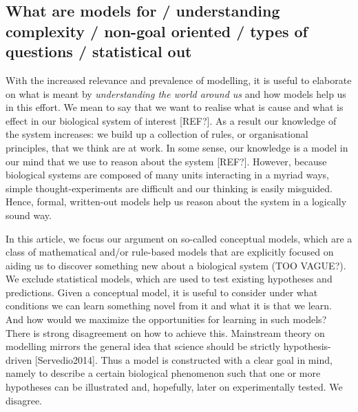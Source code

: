 \subsection{What are models for / understanding complexity / non-goal oriented / types of questions / statistical out}

With the increased relevance and prevalence of modelling, it is useful to elaborate on what is meant by \emph{understanding the world around us} and how models help us in this effort. We mean to say that we want to realise what is cause and what is effect in our biological system of interest [REF?]. As a result our knowledge of the system increases: we build up a collection of rules, or organisational principles, that we think are at work. In some sense, our knowledge is a model in our mind that we use to reason about the system [REF?]. However, because biological systems are composed of many units interacting in a myriad ways, simple thought-experiments are difficult and our thinking is easily misguided. Hence, formal, written-out models help us reason about the system in a logically sound way.

In this article, we focus our argument on so-called conceptual models, which are a class of mathematical and/or rule-based models that are explicitly focused on aiding us to discover something new about a biological system (TOO VAGUE?). We exclude statistical models, which are used to test existing hypotheses and predictions. Given a conceptual model, it is useful to consider under what conditions we can learn something novel from it and what it is that we learn. And how would we maximize the opportunities for learning in such models? There is strong disagreement on how to achieve this. Mainstream theory on modelling mirrors the general idea that science should be strictly hypothesis-driven [Servedio2014]. Thus a model is constructed with a clear goal in mind, namely to describe a certain biological phenomenon such that one or more hypotheses can be illustrated and, hopefully, later on experimentally tested. We disagree.
